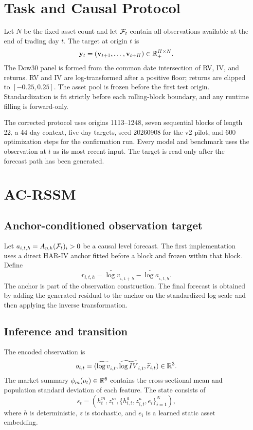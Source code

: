 \documentclass[11pt]{article}
\begin{document}
\section{Task and Causal Protocol}
Let $N$ be the fixed asset count and let $\mathcal F_t$ contain all observations available at the end of trading day $t$. The target at origin $t$ is
\begin{equation}
 \mathbf y_t=(\mathbf v_{t+1},\ldots,\mathbf v_{t+H})\in\mathbb R_+^{H\times N}.
\end{equation}
The Dow30 panel is formed from the common date intersection of RV, IV, and returns. RV and IV are log-transformed after a positive floor; returns are clipped to $[-0.25,0.25]$. The asset pool is frozen before the first test origin. Standardization is fit strictly before each rolling-block boundary, and any runtime filling is forward-only.

The corrected protocol uses origins 1113--1248, seven sequential blocks of length 22, a 44-day context, five-day targets, seed 20260908 for the v2 pilot, and 600 optimization steps for the confirmation run. Every model and benchmark uses the observation at $t$ as its most recent input. The target is read only after the forecast path has been generated.

\section{AC-RSSM}
\subsection{Anchor-conditioned observation target}
Let $a_{i,t,h}=A_{\eta,h}(\mathcal F_t)_i>0$ be a causal level forecast. The first implementation uses a direct HAR-IV anchor fitted before a block and frozen within that block. Define
\begin{equation}
 r_{i,t,h}=\widetilde{\log v}_{i,t+h}-\widetilde{\log a}_{i,t,h}.
\end{equation}
The anchor is part of the observation construction. The final forecast is obtained by adding the generated residual to the anchor on the standardized log scale and then applying the inverse transformation.

\subsection{Inference and transition}
The encoded observation is
\begin{equation}
 o_{i,t}=(\widetilde{\log v}_{i,t},\widetilde{\log IV}_{i,t},\widetilde r_{i,t})\in\mathbb R^3.
\end{equation}
The market summary $\phi_m(o_t)\in\mathbb R^6$ contains the cross-sectional mean and population standard deviation of each feature. The state consists of
\begin{equation}
 s_t=\left(h_t^m,z_t^m,\{h_{i,t}^a,z_{i,t}^a,e_i\}_{i=1}^N\right),
\end{equation}
where $h$ is deterministic, $z$ is stochastic, and $e_i$ is a learned static asset embedding.
\end{document}
